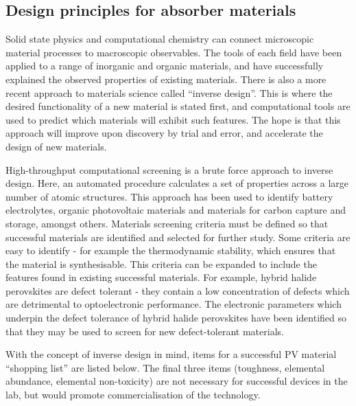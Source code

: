  \subsection{Design principles for absorber materials}
 
Solid state physics and computational chemistry can connect microscopic material processes to macroscopic observables. The tools of each field have been applied to a range of inorganic and organic materials, and have successfully explained the observed properties of existing materials.
There is also a more recent approach to materials science called ``inverse design''. This is where the desired functionality of a new material is stated first, and computational tools are used to predict which materials will exhibit such features.\autocite{Zunger2018}
The hope is that this approach will improve upon discovery by trial and error, and accelerate the design of new materials.

High-throughput computational screening is a brute force approach to inverse design. Here, an automated procedure calculates a set of properties across a large number of atomic structures. This approach has been used to identify battery electrolytes,\autocite{Qu2015} organic photovoltaic materials\autocite{Hachmann2011} and materials for carbon capture and storage,\autocite{Dunstan2016} amongst others. 
Materials screening criteria must be defined so that successful materials are identified and selected for further study. Some criteria are easy to identify - for example the thermodynamic stability, which ensures that the material is synthesisable. This criteria can be expanded to include the features found in existing successful materials. For example, hybrid halide perovskites are defect tolerant - they contain a low concentration of defects which are detrimental to optoelectronic performance. The electronic parameters which underpin the defect tolerance of hybrid halide perovskites have been identified so that they may be used to screen for new defect-tolerant materials.\autocite{Brandt2015} 

With the concept of inverse design in mind, items for a successful PV material ``shopping list'' are listed below. The final three items (toughness, elemental abundance, elemental non-toxicity) are not necessary for successful devices in the lab, but would promote commercialisation of the technology.


